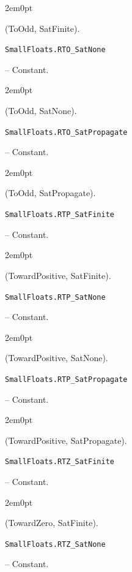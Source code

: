 \begin{adjustwidth}{2em}{0pt}

(ToOdd, SatFinite).



\end{adjustwidth}
\hypertarget{16442577991271067062}{\texttt{SmallFloats.RTO\_SatNone}}  -- {Constant.}

\begin{adjustwidth}{2em}{0pt}

(ToOdd, SatNone).



\end{adjustwidth}
\hypertarget{15307190884920783579}{\texttt{SmallFloats.RTO\_SatPropagate}}  -- {Constant.}

\begin{adjustwidth}{2em}{0pt}

(ToOdd, SatPropagate).



\end{adjustwidth}
\hypertarget{7512419803180778431}{\texttt{SmallFloats.RTP\_SatFinite}}  -- {Constant.}

\begin{adjustwidth}{2em}{0pt}

(TowardPositive, SatFinite).



\end{adjustwidth}
\hypertarget{11481809423421058656}{\texttt{SmallFloats.RTP\_SatNone}}  -- {Constant.}

\begin{adjustwidth}{2em}{0pt}

(TowardPositive, SatNone).



\end{adjustwidth}
\hypertarget{5630752953060625376}{\texttt{SmallFloats.RTP\_SatPropagate}}  -- {Constant.}

\begin{adjustwidth}{2em}{0pt}

(TowardPositive, SatPropagate).



\end{adjustwidth}
\hypertarget{8937139283316265274}{\texttt{SmallFloats.RTZ\_SatFinite}}  -- {Constant.}

\begin{adjustwidth}{2em}{0pt}

(TowardZero, SatFinite).



\end{adjustwidth}
\hypertarget{569534270503185777}{\texttt{SmallFloats.RTZ\_SatNone}}  -- {Constant.}

